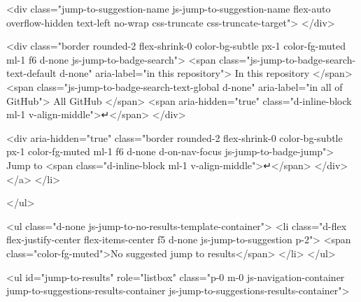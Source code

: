     <div class="jump-to-suggestion-name js-jump-to-suggestion-name flex-auto overflow-hidden text-left no-wrap css-truncate css-truncate-target">
    </div>

    <div class="border rounded-2 flex-shrink-0 color-bg-subtle px-1 color-fg-muted ml-1 f6 d-none js-jump-to-badge-search">
      <span class="js-jump-to-badge-search-text-default d-none" aria-label="in this repository">
        In this repository
      </span>
      <span class="js-jump-to-badge-search-text-global d-none" aria-label="in all of GitHub">
        All GitHub
      </span>
      <span aria-hidden="true" class="d-inline-block ml-1 v-align-middle">↵</span>
    </div>

    <div aria-hidden="true" class="border rounded-2 flex-shrink-0 color-bg-subtle px-1 color-fg-muted ml-1 f6 d-none d-on-nav-focus js-jump-to-badge-jump">
      Jump to
      <span class="d-inline-block ml-1 v-align-middle">↵</span>
    </div>
  </a>
</li>

</ul>

<ul class="d-none js-jump-to-no-results-template-container">
  <li class="d-flex flex-justify-center flex-items-center f5 d-none js-jump-to-suggestion p-2">
    <span class="color-fg-muted">No suggested jump to results</span>
  </li>
</ul>

<ul id="jump-to-results" role="listbox" class="p-0 m-0 js-navigation-container jump-to-suggestions-results-container js-jump-to-suggestions-results-container">
  

